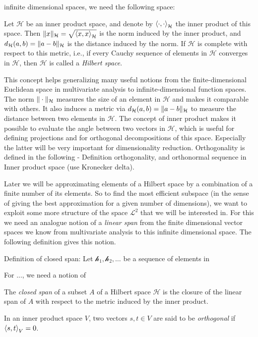 infinite dimensional spaces, we need the following space:
\begin{definition}
    \label{def:hilbert space}
    Let $\mathcal{H}$ be an inner product space, and denote by $\left \langle \cdot, \cdot \right \rangle_\mathcal{H}$
    the inner product of this space. Then $\|x\|_\mathcal{H} = \sqrt{\left \langle x, x \right \rangle_\mathcal{H}}$
    is the norm induced by the inner product, and $d_\mathcal{H}(a, b) = \|a - b\|_\mathcal{H}$
    is the distance induced by the norm. If $\mathcal{H}$ is complete with respect
    to this metric, i.e., if every Cauchy sequence of elements in $\mathcal{H}$ converges
    in $\mathcal{H}$, then $\mathcal{H}$ is called a \textit{Hilbert space}.
\end{definition}
This concept helps generalizing many useful notions from the finite-dimensional
Euclidean space in multivariate analysis to infinite-dimensional function spaces. The norm
$\|\cdot\|_\mathcal{H}$ measures the size of an element in $\mathcal{H}$ and makes it
comparable with others. It also induces a metric via
$d_\mathcal{H}(a, b) = \|a - b\|_\mathcal{H}$ to measure the distance between two
elements in $\mathcal{H}$. The concept of inner product makes it possible to evaluate
the angle between two vectors in $\mathcal{H}$, which is useful for defining projections
and for orthogonal decompositions of this space. Especially the latter will be very
important for dimensionality reduction. Orthogonality is defined in the following
- Definition orthogonality, and orthonormal sequence in Inner product space (use Kronecker
delta).

Later we will be approximating elements of a Hilbert space by a combination of a finite
number of its elements. So to find the most efficient subspace (in the sense of giving the
best approximation for a given number of dimensions), we want to exploit some more
structure of the space $\mathcal{L}^2$ that we will be interested in. For this we need an analogue notion of a \textit{linear span}
from the finite dimensional vector spaces we know from multivariate analysis to this
infinite dimensional space. The following definition gives this notion.

Definition of closed span: Let $\mathcal{h}_1,\mathcal{h}_2, \dots $ be a sequence of
elements in 




For ..., we need a notion of 
\begin{definition}
    \label{def:closed span}
    The \textit{closed span} of a subset \( A \) of a Hilbert space \( \mathcal{H} \) is the 
    closure of the linear span of \( A \) with respect to the metric induced by the inner product.

    In an inner product space \( V \), two vectors \( s, t \in V \) are said to be
    \textit{orthogonal} if
    $\left \langle s, t \right \rangle_V = 0 $.
\end{definition}

